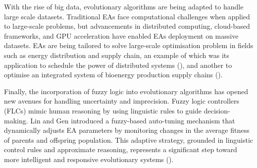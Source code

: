\parbreak\noindent With the rise of big data, evolutionary algorithms are being adapted to handle large scale datasets. Traditional EAs face computational challenges when applied to large-scale problems, but advancements in distributed computing, cloud-based frameworks, and GPU acceleration have enabled EAs deployment on massive datasets. EAs are being tailored to solve large-scale optimisation problem in fields such as energy distribution and supply chain, an example of which was its application to schedule the power of distributed systems (\cite{guzek2014multi}), and another to optimise an integrated system of bioenergy production supply chains (\cite{ayoub2009evolutionary}).

\parbreak\noindent Finally, the incorporation of fuzzy logic into evolutionary algorithms has opened new avenues for handling uncertainty and imprecision. Fuzzy logic controllers (FLCs) mimic human reasoning by using linguistic rules to guide decision-making. Lin and Gen introduced a fuzzy-based auto-tuning mechanism that dynamically adjusts EA parameters by monitoring changes in the average fitness of parents and offspring population. This adaptive strategy, grounded in linguistic control rules and approximate reasoning, represents a significant step toward more intelligent and responsive evolutionary systems (\cite{Gen2023}).